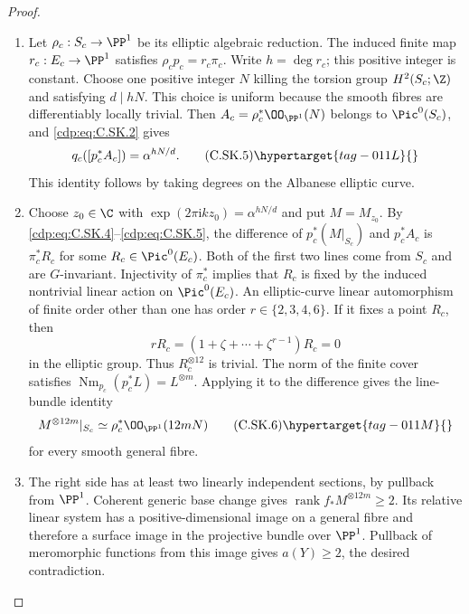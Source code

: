 \begin{proof}
\begin{enumerate}[label=\arabic*.,leftmargin=*]
\item Let $\rho_c:S_c\to\PP^1$ be its elliptic algebraic
reduction. The induced finite map $r_c:E_c\to\PP^1$
satisfies $\rho_c p_c=r_c\pi_c$. Write $h=\deg r_c$;
this positive integer is constant. Choose one positive
integer $N$ killing the torsion group $H^2(S_c;\Z)$
and satisfying $d\mid hN$. This choice is uniform
because the smooth fibres are differentiably locally
trivial. Then
$A_c=\rho_c^*\OO_{\PP^1}(N)$ belongs to $\Pic^0(S_c)$,
and \eqref{cdp:eq:C.SK.2} gives
\[
 q_c([p_c^*A_c])=\alpha^{hN/d}.
\tag{C.SK.5}\hypertarget{tag-011L}{}\label{cdp:eq:C.SK.5}
\]
This identity follows by taking degrees on the Albanese elliptic
curve.

\item Choose $z_0\in\C$ with
$\exp(2\pi\mathrm i k z_0)=\alpha^{hN/d}$ and put
$M=M_{z_0}$. By \eqref{cdp:eq:C.SK.4}--\eqref{cdp:eq:C.SK.5}, the difference of
$p_c^*(M|_{S_c})$ and $p_c^*A_c$ is
$\pi_c^*R_c$ for some $R_c\in\Pic^0(E_c)$.
Both of the first two lines come from $S_c$ and are
$G$-invariant. Injectivity of $\pi_c^*$ implies that
$R_c$ is fixed by the induced nontrivial linear action
on $\Pic^0(E_c)$. An elliptic-curve linear automorphism
of finite order other than one has order
$r\in\{2,3,4,6\}$. If it fixes a point $R_c$, then
\[
 rR_c=(1+\zeta+\cdots+\zeta^{r-1})R_c=0
\]
in the elliptic group. Thus $R_c^{\otimes12}$ is
trivial. The norm of the finite cover satisfies
$\operatorname{Nm}_{p_c}(p_c^*L)=L^{\otimes m}$.
Applying it to the difference gives the line-bundle identity
\[
 M^{\otimes12m}|_{S_c}
       \simeq \rho_c^*\OO_{\PP^1}(12mN)
\tag{C.SK.6}\hypertarget{tag-011M}{}\label{cdp:eq:C.SK.6}
\]
for every smooth general fibre.

\item The right side has at least two linearly independent
sections, by pullback from $\PP^1$. Coherent generic
base change gives
$\operatorname{rank}f_*M^{\otimes12m}\ge2$.
Its relative linear system has a positive-dimensional
image on a general fibre and therefore a surface
image in the projective bundle over $\PP^1$.
Pullback of meromorphic functions from this image
gives $a(Y)\ge2$, the desired contradiction.

\end{enumerate}
\end{proof}